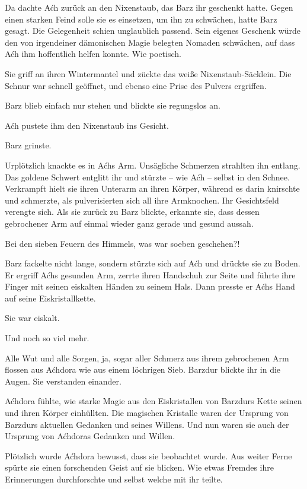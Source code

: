 Da dachte Aćh zurück an den Nixenstaub, das Barz ihr geschenkt hatte. Gegen einen starken Feind solle sie es einsetzen, um ihn zu schwächen, hatte Barz gesagt. Die Gelegenheit schien unglaublich passend. Sein eigenes Geschenk würde den von irgendeiner dämonischen Magie belegten Nomaden schwächen, auf dass Aćh ihm hoffentlich helfen konnte. Wie poetisch.

Sie griff an ihren Wintermantel und zückte das weiße Nixenstaub-Säcklein. Die Schnur war schnell geöffnet, und ebenso eine Prise des Pulvers ergriffen.

Barz blieb einfach nur stehen und blickte sie regungslos an.

Aćh pustete ihm den Nixenstaub ins Gesicht.

Barz grinste.

Urplötzlich knackte es in Aćhs Arm. Unsägliche Schmerzen strahlten ihn entlang. Das goldene Schwert entglitt ihr und stürzte – wie Aćh – selbst in den Schnee. Verkrampft hielt sie ihren Unterarm an ihren Körper, während es darin knirschte und schmerzte, als pulverisierten sich all ihre Armknochen. Ihr Gesichtsfeld verengte sich. Als sie zurück zu Barz blickte, erkannte sie, dass dessen gebrochener Arm auf einmal wieder ganz gerade und gesund aussah.

Bei den sieben Feuern des Himmels, was war soeben geschehen?!

Barz fackelte nicht lange, sondern stürzte sich auf Aćh und drückte sie zu Boden. Er ergriff Aćhs gesunden Arm, zerrte ihren Handschuh zur Seite und führte ihre Finger mit seinen eiskalten Händen zu seinem Hals. Dann presste er Aćhs Hand auf seine Eiskristallkette.

Sie war eiskalt.

Und noch so viel mehr.\bigskip







Alle Wut und alle Sorgen, ja, sogar aller Schmerz aus ihrem gebrochenen Arm flossen aus Aćhdora wie aus einem löchrigen Sieb. Barzdur blickte ihr in die Augen. Sie verstanden einander.

Aćhdora fühlte, wie starke Magie aus den Eiskristallen von Barzdurs Kette seinen und ihren Körper einhüllten. Die magischen Kristalle waren der Ursprung von Barzdurs aktuellen Gedanken und seines Willens. Und nun waren sie auch der Ursprung von Aćhdoras Gedanken und Willen.

Plötzlich wurde Aćhdora bewusst, dass sie beobachtet wurde. Aus weiter Ferne spürte sie einen forschenden Geist auf sie blicken. Wie etwas Fremdes ihre Erinnerungen durchforschte und selbst welche mit ihr teilte.

